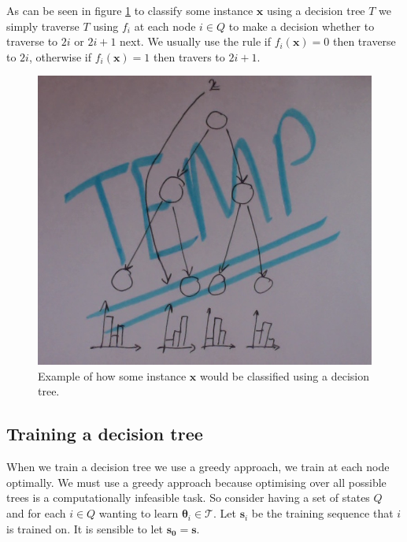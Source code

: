 \documentclass[12pt,twoside,notitlepage]{report}
\newcommand{\vc}[1]{\mathbf{#1}}
\newcommand{\cl}[1]{\mathcal{#1}}
\begin{document}
            As can be seen in figure \ref{fig:decision_tree_classify} to classify some instance $\vc{x}$ using a 
            decision tree $T$ we simply traverse $T$ using $f_i$ at each node $i \in Q$ to make a decision whether 
            to traverse to $2i$ or $2i+1$ next. We usually use the rule if $f_i(\vc{x}) = 0$ then traverse to 
            $2i$, otherwise if $f_i(\vc{x}) = 1$ then travers to $2i+1$. \cite{criminisi2013decision}

            \begin{figure}[H]
                \centering
                \includegraphics[scale=0.5]{tree_example_classification.jpeg}
                \caption{Example of how some instance $\vc{x}$ would be classified using a decision tree.}
                \label{fig:decision_tree_classify}
            \end{figure}

        \subsection{Training a decision tree}
            When we train a decision tree we use a greedy approach, we train at each node optimally. We must use a 
            greedy approach because optimising over all possible trees is a computationally infeasible task. So consider 
            having a set of states $Q$ and for each $i \in Q$ wanting to learn $\vc{\theta}_i \in \cl{T}$. Let $\vc{s}_i$ 
            be the training sequence that $i$ is trained on. It is sensible to let $\vc{s_0}=\vc{s}$. 
\end{document}

